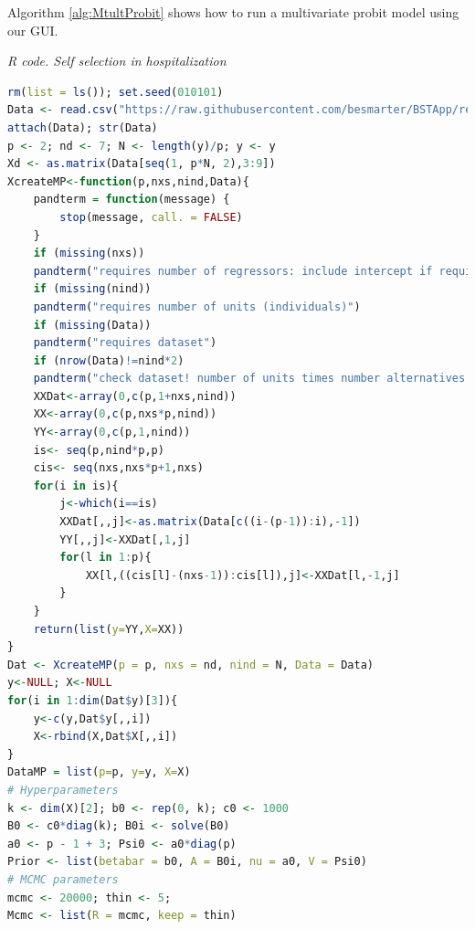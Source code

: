 Algorithm \ref{alg:MtultProbit} shows how to run a multivariate probit model using our GUI.
\begin{tcolorbox}[enhanced,width=4.67in,center upper,
	fontupper=\large\bfseries,drop shadow southwest,sharp corners]
	\textit{R code. Self selection in hospitalization}
	\begin{VF}
		\begin{lstlisting}[language=R]
rm(list = ls()); set.seed(010101)
Data <- read.csv("https://raw.githubusercontent.com/besmarter/BSTApp/refs/heads/master/DataApp/7HealthMed.csv", sep = ",", header = TRUE, quote = "")
attach(Data); str(Data)
p <- 2; nd <- 7; N <- length(y)/p; y <- y
Xd <- as.matrix(Data[seq(1, p*N, 2),3:9])
XcreateMP<-function(p,nxs,nind,Data){
	pandterm = function(message) {
		stop(message, call. = FALSE)
	}
	if (missing(nxs)) 
	pandterm("requires number of regressors: include intercept if required")
	if (missing(nind)) 
	pandterm("requires number of units (individuals)")
	if (missing(Data)) 
	pandterm("requires dataset")
	if (nrow(Data)!=nind*2)
	pandterm("check dataset! number of units times number alternatives should be equal to dataset rows")
	XXDat<-array(0,c(p,1+nxs,nind))
	XX<-array(0,c(p,nxs*p,nind))
	YY<-array(0,c(p,1,nind))
	is<- seq(p,nind*p,p)
	cis<- seq(nxs,nxs*p+1,nxs)
	for(i in is){
		j<-which(i==is)
		XXDat[,,j]<-as.matrix(Data[c((i-(p-1)):i),-1])
		YY[,,j]<-XXDat[,1,j]
		for(l in 1:p){
			XX[l,((cis[l]-(nxs-1)):cis[l]),j]<-XXDat[l,-1,j]
		}
	}
	return(list(y=YY,X=XX))
}
Dat <- XcreateMP(p = p, nxs = nd, nind = N, Data = Data)
y<-NULL; X<-NULL
for(i in 1:dim(Dat$y)[3]){
	y<-c(y,Dat$y[,,i])
	X<-rbind(X,Dat$X[,,i])
}
DataMP = list(p=p, y=y, X=X)
# Hyperparameters
k <- dim(X)[2]; b0 <- rep(0, k); c0 <- 1000
B0 <- c0*diag(k); B0i <- solve(B0)
a0 <- p - 1 + 3; Psi0 <- a0*diag(p)
Prior <- list(betabar = b0, A = B0i, nu = a0, V = Psi0)
# MCMC parameters
mcmc <- 20000; thin <- 5; 
Mcmc <- list(R = mcmc, keep = thin)
\end{lstlisting}
	\end{VF}
\end{tcolorbox}

